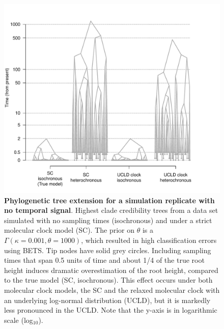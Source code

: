 \documentclass[10pt,letterpaper]{article}
\begin{document}
\begin{figure}[h!]
	\begin{center}
		\includegraphics[width=15cm]{sandbox_figures/tree_distortion_ultrametric.pdf}\newline
		\vspace{-0.5cm}
		\caption{\textbf{Phylogenetic tree extension for a simulation replicate with no temporal signal}. Highest clade credibility trees from a data set simulated with no sampling times (isochronous) and under a strict molecular clock model (SC). The prior on $\theta$ is a $\Gamma(\kappa=0.001, \theta=1000)$, which resulted in high classification errors using BETS. Tip nodes have solid grey circles. Including sampling times that span 0.5 units of time and about 1/4 of the true root height induces dramatic overestimation of the root height, compared to the true model (SC, isochronous). This effect  occurs under both molecular clock models, the SC and the relaxed molecular clock with an underlying log-normal distribution (UCLD), but it is markedly less pronounced in the UCLD. Note that the y-axis is in logarithmic scale (log$_{10}$).}
		\label{figure:ultrametric_tree_distortion}
	\end{center}
\end{figure}
\end{document}
